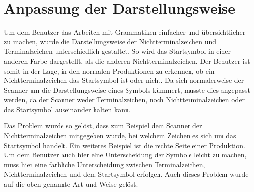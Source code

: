 \section{Anpassung der Darstellungsweise}\label{ParserAdaption}

Um dem Benutzer das Arbeiten mit Grammatiken einfacher und übersichtlicher zu
machen, wurde die Darstellungsweise der Nichtterminalzeichen und
Terminalzeichen unterschiedlich gestaltet. So wird das Startsymbol in einer
anderen Farbe dargestellt, als die anderen Nichtterminalzeichen. Der Benutzer
ist somit in der Lage, in den normalen Produktionen zu erkennen, ob ein
Nichtterminalzeichen das Startsymbol ist oder nicht. Da sich normalerweise der
Scanner um die Darstellungsweise eines Symbols kümmert, musste dies angepasst
werden, da der Scanner weder Terminalzeichen, noch Nichtterminalzeichen oder
das Startsymbol auseinander halten kann.\vspace{10pt}

Das Problem wurde so gelöst, dass zum Beispiel dem Scanner der
Nichtterminalzeichen mitgegeben wurde, bei welchem Zeichen es sich um das
Startsymbol handelt. Ein weiteres Beispiel ist die rechte Seite einer
Produktion. Um dem Benutzer auch hier eine Unterscheidung der Symbole leicht zu
machen, muss hier eine farbliche Unterscheidung zwischen Terminalzeichen,
Nichtterminalzeichen und dem Startsymbol erfolgen. Auch dieses Problem wurde auf
die oben genannte Art und Weise gelöst.\vspace{10pt}
